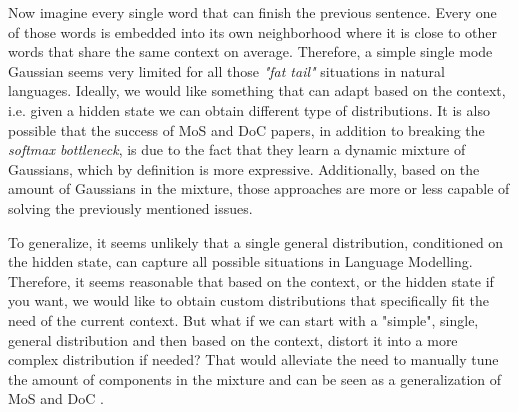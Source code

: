 
Now imagine every single word that can finish the previous sentence. Every one of those words is embedded into its own neighborhood where it is close to other words that share the same context on average. Therefore, a simple single mode Gaussian seems very limited for all those \emph{"fat tail"} situations in natural languages. Ideally, we would like something that can adapt based on the context, i.e. given a hidden state we can obtain different type of distributions. It is also possible that the success of MoS \citep{yang2017breaking} and DoC \citep{takase2018direct} papers, in addition to breaking the \emph{softmax bottleneck}, is due to the fact that they learn a dynamic mixture of Gaussians, which by definition is more expressive. Additionally, based on the amount of Gaussians in the mixture, those approaches are more or less capable of solving the previously mentioned issues.

To generalize, it seems unlikely that a single general distribution, conditioned on the hidden state, can capture all possible situations in Language Modelling. Therefore, it seems reasonable that based on the context, or the hidden state if you want, we would like to obtain custom distributions that specifically fit the need of the current context. But what if we can start with a "simple", single, general distribution and then based on the context, distort it into a more complex distribution if needed? That would alleviate the need to manually tune the amount of components in the mixture and can be seen as a generalization of MoS \citep{yang2017breaking} and DoC \citep{takase2018direct}.
